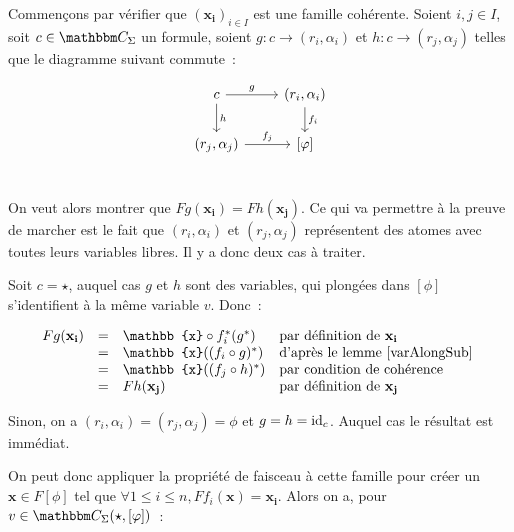 \begin{pv}
    Commençons par vérifier que $(\mathbf{x_i})_{i\in I}$ est une famille cohérente. Soient
    $i,j\in I$, soit $c\in\C_\Sigma$ un formule, soient
    $g:c\rightarrow (r_i,\alpha_i)$
    et $h:c\rightarrow (r_j,\alpha_j)$ telles que le diagramme suivant commute~:

    \[\begin{tikzcd}
        c \arrow[r, "g"] \arrow[d, "h"] & (r_i,\alpha_i) \arrow[d, "f_i"] \\
          (r_j,\alpha_j) \arrow[r, "f_j"] & \brk{\phi} \\
    \end{tikzcd}\]

    On veut alors montrer que $Fg(\mathbf{x_i}) = Fh(\mathbf{x_j})$. Ce qui va
    permettre à la preuve de marcher est le fait que $(r_i,\alpha_i)$ et
    $(r_j,\alpha_j)$ représentent des atomes avec toutes leurs variables
    libres. Il y a donc deux cas à traiter.

    Soit $c = \star$, auquel cas $g$ et $h$ sont des variables, qui plongées dans 
    $[\phi]$ s'identifient à la même variable $v$. Donc~:
    
    \[\begin{array}{rcll}
        Fg(\mathbf{x_i}) & = & \mathbb{x}\circ f_i^*(g^*)
                             & \text{par définition de } \mathbf{x_i} \\
                         & = & \mathbb{x}((f_i\circ g)^*)
                             & \text{d'après le lemme \ref{varAlongSub} } \\
                         & = & \mathbb{x}((f_j\circ h)^*)
                             & \text{par condition de cohérence} \\
                         & = & Fh(\mathbf{x_j})
                             & \text{par définition de } \mathbf{x_j} \\
    \end{array}\]

    Sinon, on a $(r_i,\alpha_i) = (r_j,\alpha_j) = \phi$ et $g = h = \operatorname{id}_c$. Auquel cas le
    résultat est immédiat.

    On peut donc appliquer la propriété de faisceau à cette famille pour créer un
    $\mathbf{x}\in F[\phi]$ tel que
    $\forall 1\leq i\leq n, Ff_i(\mathbf{x}) = \mathbf{x_i}$. Alors on a, pour
    $v\in\C_\Sigma(\star,[\phi])$~:


\end{pv}
